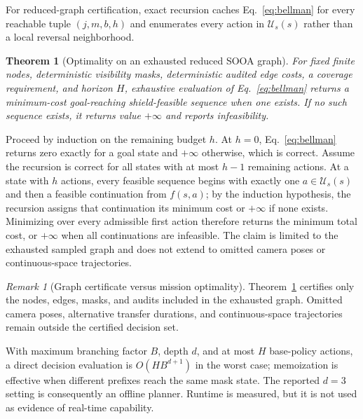 \documentclass{IEEEtaes}
\newtheorem{theorem}{Theorem}
\theoremstyle{remark}
\newtheorem{remark}{Remark}
\theoremstyle{plain}
\begin{document}
For reduced-graph certification, exact recursion caches Eq.~\eqref{eq:bellman} for every reachable tuple $(j,m,b,h)$ and enumerates every action in $\mathcal U_s(s)$ rather than a local reversal neighborhood.

\begin{theorem}[Optimality on an exhausted reduced SOOA graph]
\label{thm:reduced-optimality}
For fixed finite nodes, deterministic visibility masks, deterministic audited edge costs, a coverage requirement, and horizon $H$, exhaustive evaluation of Eq.~\eqref{eq:bellman} returns a minimum-cost goal-reaching shield-feasible sequence when one exists. If no such sequence exists, it returns value $+\infty$ and reports infeasibility.
\end{theorem}

\begin{IEEEproof}
Proceed by induction on the remaining budget $h$. At $h=0$, Eq.~\eqref{eq:bellman} returns zero exactly for a goal state and $+\infty$ otherwise, which is correct. Assume the recursion is correct for all states with at most $h-1$ remaining actions. At a state with $h$ actions, every feasible sequence begins with exactly one $a\in\mathcal U_s(s)$ and then a feasible continuation from $f(s,a)$; by the induction hypothesis, the recursion assigns that continuation its minimum cost or $+\infty$ if none exists. Minimizing over every admissible first action therefore returns the minimum total cost, or $+\infty$ when all continuations are infeasible. The claim is limited to the exhausted sampled graph and does not extend to omitted camera poses or continuous-space trajectories.
\end{IEEEproof}

\begin{remark}[Graph certificate versus mission optimality]
Theorem~\ref{thm:reduced-optimality} certifies only the nodes, edges, masks, and audits included in the exhausted graph. Omitted camera poses, alternative transfer durations, and continuous-space trajectories remain outside the certified decision set.
\end{remark}

With maximum branching factor $B$, depth $d$, and at most $H$ base-policy actions, a direct decision evaluation is $O(HB^{d+1})$ in the worst case; memoization is effective when different prefixes reach the same mask state. The reported $d=3$ setting is consequently an offline planner. Runtime is measured, but it is not used as evidence of real-time capability.
\end{document}
